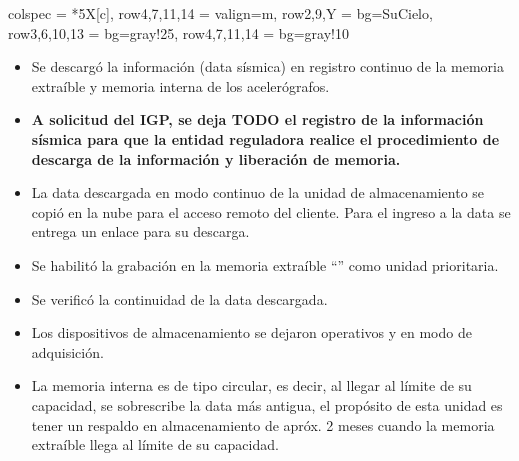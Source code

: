 \begin{longtblr}{
		colspec = {*{5}{X[c]}},
		row{4,7,11,14} = {valign=m},
		row{2,9,Y} = {bg=SuCielo},
		row{3,6,10,13} = {bg=gray!25},
		row{4,7,11,14} = {bg=gray!10}
	}
\begin{itemize}
		\item Se descargó la información (data sísmica) en registro continuo de la memoria extraíble y memoria interna de los acelerógrafos.
		\item {\bfseries\color{SuAzul} A solicitud del IGP, se deja TODO el registro de la información sísmica para que la entidad reguladora realice el procedimiento de descarga de la información y liberación de memoria.}
		\item La data descargada en modo continuo de la unidad de almacenamiento se copió en la nube para el acceso remoto del cliente. Para el ingreso a la data se entrega un enlace para su descarga.
		\item Se habilitó la grabación en la memoria extraíble ``'' como unidad prioritaria.
		\item Se verificó la continuidad de la data descargada.
		\item Los dispositivos de almacenamiento se dejaron operativos y en modo de adquisición.
		\item La memoria interna es de tipo circular, es decir, al llegar al límite de su capacidad, se sobrescribe la data más antigua, el propósito de esta unidad es tener un respaldo en almacenamiento de apróx. 2 meses cuando la memoria extraíble llega al límite de su capacidad.
	\end{itemize}
\end{longtblr}